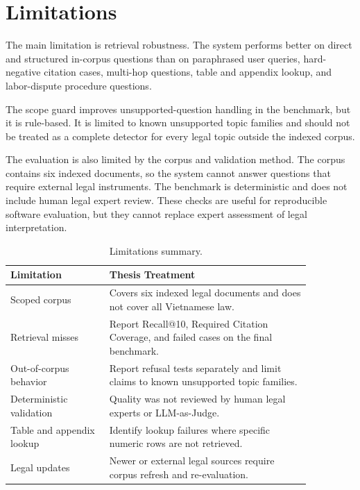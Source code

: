 \section{Limitations}
The main limitation is retrieval robustness. The system performs better on direct and structured in-corpus questions than on paraphrased user queries, hard-negative citation cases, multi-hop questions, table and appendix lookup, and labor-dispute procedure questions.

The scope guard improves unsupported-question handling in the benchmark, but it is rule-based. It is limited to known unsupported topic families and should not be treated as a complete detector for every legal topic outside the indexed corpus.

The evaluation is also limited by the corpus and validation method. The corpus contains six indexed documents, so the system cannot answer questions that require external legal instruments. The benchmark is deterministic and does not include human legal expert review. These checks are useful for reproducible software evaluation, but they cannot replace expert assessment of legal interpretation.

\begin{table}[H]
  \centering
  \caption{Limitations summary.}
  \label{tab:limitations}
  \begin{tabular}{p{0.28\linewidth}p{0.58\linewidth}}
    \toprule
    Limitation & Thesis Treatment \\
    \midrule
    Scoped corpus & Covers six indexed legal documents and does not cover all Vietnamese law. \\
    Retrieval misses & Report Recall@10, Required Citation Coverage, and failed cases on the final benchmark. \\
    Out-of-corpus behavior & Report refusal tests separately and limit claims to known unsupported topic families. \\
    Deterministic validation & Quality was not reviewed by human legal experts or LLM-as-Judge. \\
    Table and appendix lookup & Identify lookup failures where specific numeric rows are not retrieved. \\
    Legal updates & Newer or external legal sources require corpus refresh and re-evaluation. \\
    \bottomrule
  \end{tabular}
\end{table}
